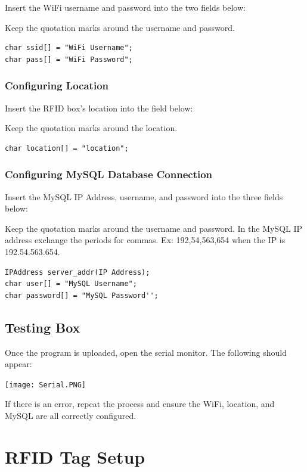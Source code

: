 \documentclass[12pt]{article}
\begin{document}
\begin{spacing}{1.2}
Insert the WiFi username and password into the two fields below:

Keep the quotation marks around the username and password.
\begin{lstlisting}[language=Arduino]
char ssid[] = "WiFi Username";
char pass[] = "WiFi Password";
\end{lstlisting}


\subsubsection{Configuring Location}

Insert the RFID box's location into the field below:

Keep the quotation marks around the location.

\begin{lstlisting}[language=Arduino]
char location[] = "location"; 
\end{lstlisting}

\subsubsection{Configuring MySQL Database Connection}

Insert the MySQL IP Address, username, and password into the three fields below:

Keep the quotation marks around the username and password.
In the MySQL IP address exchange the periods for commas. Ex: 192,54,563,654 when the IP is 192.54.563.654.
\begin{lstlisting}[language=Arduino]
IPAddress server_addr(IP Address); 
char user[] = "MySQL Username";    
char password[] = "MySQL Password'';   
\end{lstlisting}

\subsection{Testing Box}

Once the program is uploaded, open the serial monitor. The following should appear:

\begin{center}
\texttt{[image: Serial.PNG]}
\end{center}

If there is an error, repeat the process and ensure the WiFi, location, and MySQL are all correctly configured.

\section{RFID Tag Setup}


\end{spacing}
\end{document}
